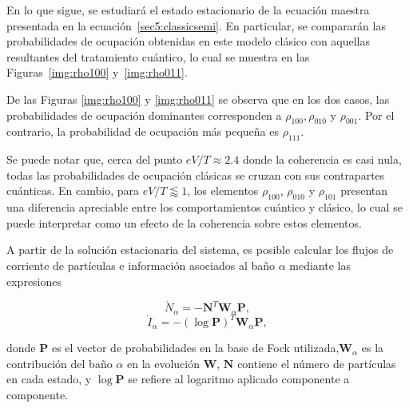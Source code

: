 En lo que sigue, se estudiará el estado estacionario de la ecuación maestra presentada en la ecuación~\ref{sec5:classicsemi}. En particular, se compararán las probabilidades de ocupación obtenidas en este modelo clásico con aquellas resultantes del tratamiento cuántico, lo cual se muestra en las Figuras~\ref{img:rho100} y~\ref{img:rho011}. 


De las Figuras \ref{img:rho100} y \ref{img:rho011} se observa que en los dos casos, las probabilidades de ocupación dominantes corresponden a $\rho_{100},\rho_{010}$ y $\rho_{001}$. Por el contrario, la probabilidad de ocupación más pequeña es $\rho_{111}$.
 
Se puede notar que, cerca del punto $eV/T \approx 2.4$ donde la coherencia es casi nula, todas las probabilidades de ocupación clásicas se cruzan con sus contrapartes cuánticas. En cambio, para $eV/T \lessapprox 1$, los elementos $\rho_{100}$, $\rho_{010}$ y $\rho_{101}$ presentan una diferencia apreciable entre los comportamientos cuántico y clásico, lo cual se puede interpretar como un efecto de la coherencia sobre estos elementos.


A partir de la solución estacionaria del sistema, es posible calcular los flujos de corriente de partículas e información asociados al baño $\alpha$ mediante las expresiones

\begin{equation}
    \dot{N}_{\alpha} = -\mathbf{N}^{T} \mathbf{W}_{\alpha}\mathbf{P},
    \label{sec5:currentsemi}
\end{equation}
\begin{equation}
    \dot{I}_{\alpha} = -(\log \mathbf{P})^{T} \mathbf{W}_{\alpha}\mathbf{P},
    \label{sec5:infosemi}
\end{equation}

donde $\mathbf{P}$ es el vector de probabilidades en la base de Fock utilizada,$\mathbf{W}_{\alpha}$ es la contribución del baño $\alpha$ en la evolución $\mathbf{W}$, $\mathbf{N}$ contiene el número de partículas en cada estado, y $\log \mathbf{P}$ se refiere al logaritmo aplicado componente a componente.

